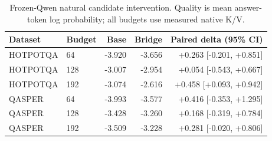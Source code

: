\begin{table}[H]\centering\small
\begin{tabular}{llrrr}\toprule
Dataset & Budget & Base & Bridge & Paired delta (95\% CI) \\
\midrule
HOTPOTQA & 64 & -3.920 & -3.656 & +0.263 [-0.201, +0.851] \\
HOTPOTQA & 128 & -3.007 & -2.954 & +0.054 [-0.543, +0.667] \\
HOTPOTQA & 192 & -3.074 & -2.616 & +0.458 [+0.093, +0.942] \\
QASPER & 64 & -3.993 & -3.577 & +0.416 [-0.353, +1.295] \\
QASPER & 128 & -3.428 & -3.260 & +0.168 [-0.319, +0.784] \\
QASPER & 192 & -3.509 & -3.228 & +0.281 [-0.020, +0.806] \\
\bottomrule\end{tabular}
\caption{Frozen-Qwen natural candidate intervention. Quality is mean answer-token log probability; all budgets use measured native K/V.}
\label{tab:paper1-natural}
\end{table}
